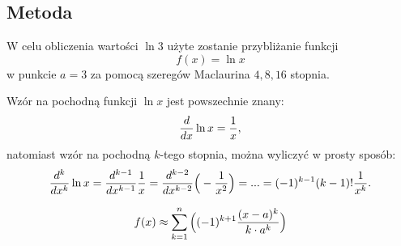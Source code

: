 \documentclass[11pt, wide, leqno]{mwart}
\begin{document}
\subsection{Metoda}

W celu obliczenia wartości $\ln3$ użyte zostanie przybliżanie funkcji
$$f(x)=\ln x$$
w punkcie $a=3$ za pomocą szeregów Maclaurina $4, 8, 16$ stopnia.

Wzór na pochodną funkcji $\ln x$ jest powszechnie znany:
$${d\over dx}\ln x=\frac1x,$$
natomiast wzór na pochodną $k$-tego stopnia, można wyliczyć w prosty sposób:
\begin{align}
    {d^k\over dx^k}\ln x={d^{k-1}\over dx^{k-1}}\frac1x={d^{k-2}\over dx^{k-2}}\Big(-\frac1{x^2}\Big)=...=(-1)^{k-1}(k-1)!\frac1{x^{k}}.
\end{align}

$$f(x)\approx\sum\limits_{k=1}^n\Big((-1)^{k+1}{(x-a)^k\over k\cdot a^{k}}\Big)$$
\end{document}
